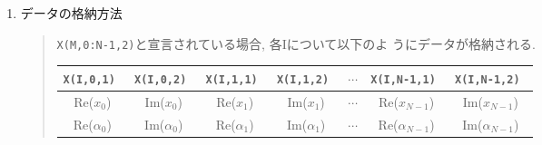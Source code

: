 \documentclass[a4j]{jarticle}
\newcommand{\R}{\mbox{Re}}
\newcommand{\I}{\mbox{Im}}
\begin{document}
\begin{enumerate}
  \item データの格納方法

  \begin{quote}

  {\tt X(M,0:N-1,2)}と宣言されている場合, 各Iについて以下のよ
   うにデータが格納される.

    \begin{tabular}{|c|c|c|c|c|c|c|}\hline
     \tt X(I,0,1) & \tt X(I,0,2) & \tt X(I,1,1) & \tt X(I,1,2) & 
     $\cdots$ & \tt X(I,N-1,1) & \tt X(I,N-1,2) \\\hline\hline
      \R($x_0$) & \I($x_0$) & \R($x_1$) & \I($x_1$) &
     $\cdots$ & \R($x_{N-1}$) & \I($x_{N-1}$) \\\hline
      \R($\alpha_0$) & \I($\alpha_0$) & \R($\alpha_1$) & \I($\alpha_1$) &
     $\cdots$ & \R($\alpha_{N-1}$) & \I($\alpha_{N-1}$) \\\hline
    \end{tabular}
  \end{quote}

\end{enumerate}

\newpage  
\end{document}

